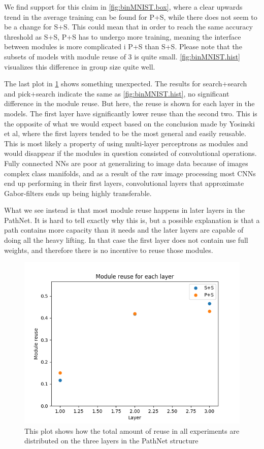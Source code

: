 We find support for this claim in \ref{fig:binMNIST.box}, where a clear upwards trend in the average training can be found for P+S, while there does not seem to be a change for S+S. This could mean that in order to reach the same accuracy threshold as S+S, P+S has to undergo more training, meaning the interface between modules is more complicated i P+S than S+S. Please note that the subsets of models with module reuse of 3 is quite small. \ref{fig:binMNIST.hist} visualizes this difference in group size quite well.

The last plot in \ref{fig:binMNIST.layer_reuse} shows something unexpected. The results for search+search and pick+search indicate the same as \ref{fig:binMNIST.hist}, no significant difference in the module reuse. But here, the reuse is shown for each layer in the models. The first layer have significantly lower reuse than the second two. This is the opposite of what we would expect based on the conclusion made by Yosinski et al\cite{yosinski2014transferable}, where the first layers tended to be the most general and easily reusable. This is most likely a property of using multi-layer perceptrons as modules and would disappear if the modules in question consisted of convolutional operations. Fully connected NNs are poor at generalizing to image data because of images complex class manifolds, and as a result of the raw image processing most CNNs end up performing in their first layers, convolutional layers that approximate Gabor-filters ends up being highly transferable.

What we see instead is that most module reuse happens in later layers in the PathNet. It is hard to tell exactly why this is, but a possible explanation is that a path contains more capacity than it needs and the later layers are capable of doing all the heavy lifting. In that case the first layer does not contain use full weights, and therefore there is no incentive to reuse those modules. 

\begin{figure}[t]
    \includegraphics[width=\textwidth]{Chapters/Experiments/first_path/figures/600binMNIST_reuse_by_layer.png}
    \caption{This plot shows how the total amount of reuse in all experiments are distributed on the three layers in the PathNet structure }
    \label{fig:binMNIST.layer_reuse}
\end{figure}

